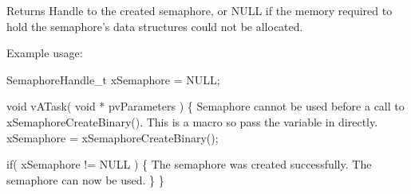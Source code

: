 \begin{DoxyReturn}{Returns}
Handle to the created semaphore, or N\-U\-L\-L if the memory required to hold the semaphore's data structures could not be allocated.
\end{DoxyReturn}
Example usage\-: 
\begin{DoxyPre}
 SemaphoreHandle\_t xSemaphore = NULL;\end{DoxyPre}



\begin{DoxyPre} void vATask( void * pvParameters )
 \{
Semaphore cannot be used before a call to xSemaphoreCreateBinary().
This is a macro so pass the variable in directly.
    xSemaphore = xSemaphoreCreateBinary();\end{DoxyPre}



\begin{DoxyPre}    if( xSemaphore != NULL )
    \{
The semaphore was created successfully.
The semaphore can now be used.
    \}
 \}
 \end{DoxyPre}
 
